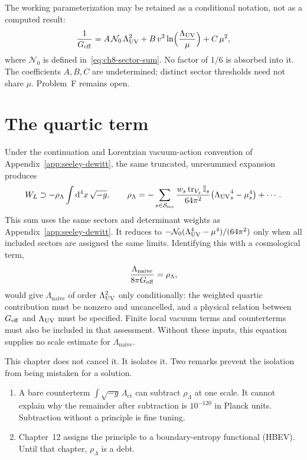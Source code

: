 \begin{remark}
  The working parameterization may be retained as a conditional
  notation, not as a computed result:
  \begin{equation}
    \label{eq:Geff-structure}
    \frac{1}{G_{\mathrm{eff}}}
    =A\,\mathcal N_0\,\Lambda_{\mathrm{UV}}^2
     +B\,v^2\ln\Bigl(\frac{\Lambda_{\mathrm{UV}}}{\mu}\Bigr)
     +C\,\mu^2,
  \end{equation}
  where \(\mathcal N_0\) is defined in~\eqref{eq:ch8-sector-sum}.
  No factor of \(1/6\) is absorbed into it. The coefficients
  \(A,B,C\) are undetermined; distinct sector thresholds need not
  share \(\mu\). Problem~F remains open.
\end{remark}

\section{The quartic term}
\label{sec:ch8-quartic}

Under the continuation and Lorentzian vacuum-action convention of
Appendix~\ref{app:seeley-dewitt}, the same truncated, unresummed
expansion produces
\begin{equation}
  \label{eq:W-Lambda}
  W_L\supset-\rho_\Lambda\int\mathrm{d}^4x\,\sqrt{-g},
  \qquad
  \rho_\Lambda
  =-\sum_{s\in\mathcal{S}_{\mathrm{sec}}}
    \frac{w_s\operatorname{tr}_{V_s}\mathbb I_s}{64\pi^2}
    \bigl({\Lambda_{\mathrm{UV}}}_s^4-\mu_s^4\bigr)+\cdots.
\end{equation}
This sum uses the same sectors and determinant weights as
Appendix~\ref{app:seeley-dewitt}. It reduces to
\(-\mathcal N_0(\Lambda_{\mathrm{UV}}^4-\mu^4)/(64\pi^2)\) only when all included
sectors are assigned the same limits.
Identifying this with a cosmological term,
\begin{equation}
  \label{eq:Lambda-naive}
  \frac{\Lambda_{\mathrm{naive}}}{8\pi G_{\mathrm{eff}}}=\rho_\Lambda,
\end{equation}
would give \(\Lambda_{\mathrm{naive}}\) of order \(\Lambda_{\mathrm{UV}}^2\) only
conditionally: the weighted quartic contribution must be nonzero
and uncancelled, and a physical relation between \(G_{\mathrm{eff}}\) and
\(\Lambda_{\mathrm{UV}}\) must be specified. Finite local vacuum terms and
counterterms must also be included in that assessment. Without
these inputs, this equation supplies no scale estimate for
\(\Lambda_{\mathrm{naive}}\).

This chapter does not cancel it. It isolates it. Two remarks prevent
the isolation from being mistaken for a solution.

\begin{enumerate}
  \item A bare counterterm \(\int\sqrt{-g}\,\Lambda_{\mathrm{ct}}\)
        can subtract \(\rho_\Lambda\) at one scale. It cannot explain
        why the remainder after subtraction is \(10^{-120}\) in
        Planck units. Subtraction without a principle is fine tuning.
  \item Chapter~12 assigns the principle to a boundary-entropy
        functional (HBEV). Until that chapter, \(\rho_\Lambda\) is a
        debt.
\end{enumerate}

